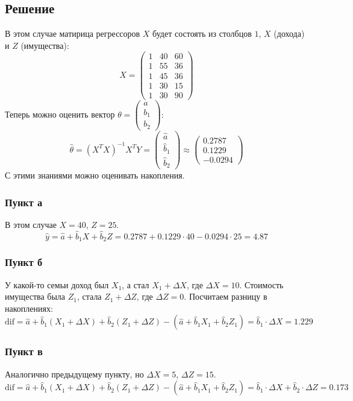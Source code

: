 \documentclass[12pt, a4paper]{article}
\begin{document}
\subsection*{Решение}
В этом случае матирица регрессоров $X$ будет состоять из столбцов $1$, $X$ (дохода) и $Z$ (имущества):
\[
X = \begin{pmatrix}
    1 & 40 & 60\\
    1 & 55 & 36\\
    1 & 45 & 36\\
    1 & 30 & 15\\
    1 & 30 & 90
\end{pmatrix}
\]
Теперь можно оценить вектор $\theta = \begin{pmatrix}
    a\\b_1\\b_2
\end{pmatrix}$:
\[
\hat \theta = \left( X^T X \right)^{-1} X^T Y = \begin{pmatrix}
    \hat a\\
    \hat b_1\\
    \hat b_2
\end{pmatrix} \approx \begin{pmatrix}
    0.2787\\
    0.1229\\
    -0.0294
\end{pmatrix}
\]
С этими знаниями можно оценивать накопления.
\subsubsection*{Пункт а}
В этом случае $X = 40$, $Z = 25$.
\[
\hat y = \hat a + \hat b_1 X + \hat b_2 Z = 0.2787 + 0.1229 \cdot 40 - 0.0294 \cdot 25 = 4.87
\]
\subsubsection*{Пункт б}
У какой-то семьи доход был $X_1$, а стал $X_1 + \Delta X$, где $\Delta X = 10$. Стоимость имущества была $Z_1$, стала $Z_1 + \Delta Z$, где $\Delta Z = 0$. Посчитаем разницу в накоплениях:
\[
\text{dif} = \hat a + \hat b_1 (X_1 + \Delta X) + \hat b_2 (Z_1 + \Delta Z) - \left( \hat a + \hat b_1 X_1 + \hat b_2 Z_1 \right) = \hat b_1 \cdot \Delta X = 1.229
\]
\subsubsection*{Пункт в}
Аналогично предыдущему пункту, но $\Delta X = 5$, $\Delta Z = 15$.
\[
\text{dif} = \hat a + \hat b_1 (X_1 + \Delta X) + \hat b_2 (Z_1 + \Delta Z) - \left( \hat a + \hat b_1 X_1 + \hat b_2 Z_1 \right) = \hat b_1 \cdot \Delta X + \hat b_2 \cdot \Delta Z = 0.173
\]
\end{document}

